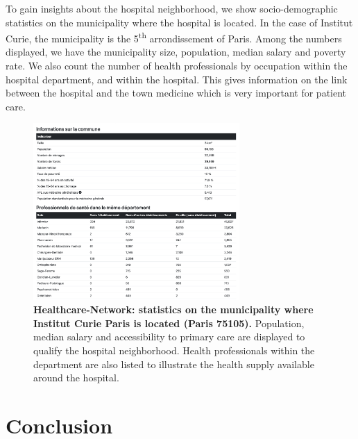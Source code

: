 To gain insights about the hospital neighborhood, we show socio-demographic
statistics on the municipality where the hospital is located. In the case of
Institut Curie, the municipality is the 5\textsuperscript{th} arrondissement of
Paris. Among the numbers displayed, we have the municipality size, population,
median salary and poverty rate. We also count the number of health professionals
by occupation within the hospital department, and within the hospital. This
gives information on the link between the hospital and the town medicine which
is very important for patient care.

\begin{figure}[h]
    \includegraphics[width=0.7\textwidth]{images/healthcare-network/curie-commune.png}
    \centering
    \caption{ \textbf{Healthcare-Network: statistics on the municipality where
            Institut Curie Paris is located (Paris 75105).} Population, median
        salary and accessibility to primary care are displayed to qualify the
        hospital neighborhood. Health professionals within the department are
        also listed to illustrate the health supply available around the
        hospital. }
    \label{fig:hn-curie-commune}
\end{figure}

\section{Conclusion}

